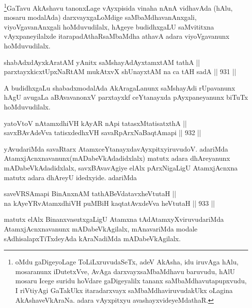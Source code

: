 \begin{artha}
\footnote{oMdu gaDigeyoLage ToLiLxruvudaSeTx, adeV AkAsha, idu iruvAga hAlu, mosaranunx iDutetxVve, AvAga darxvayxsaMbaMdhavu baruvudu, hAlU mosaru Icege suridu hoVdare gaDigeyalilx tananx saMbaMdhavutapupxvudu, I riVtiyAgi GaTakUkx itaradarxvayx saMbaMdhaviruvudakUkx oLagina AkAshaveVkAraNa. adara vAyxpitxyu avashayxvideyeMdathaR.}GaTavu AkAshavu tanonxLage vAyxpisida vinaha nAnA vidhavAda (hAlu, mosaru modalAda) darxvayxgaLoMdige saMbaMdhavanAnxgali, viyoVgavanAnxgali hoMduvudilalx, hAgeye budidhxgaLU saMvititxna vAyxpaneyilalxde itarapadAthaRsaMbaMdha athavA adara viyoVgavanunx hoMduvudilalx.
\end{artha}


\begin{shl}
shabAdxdAyxkAratAM yAnitx saMshayAdAyxtamxtAM tathA ||  \\
parxtayxkicxtUpxNaRtAM mukAtxvX shUnayxtAM na ca tAH sadA \hfill || 931 ||  
\end{shl}

\begin{artha}
A budidhxgaLu shabadxmodalAda AkAragaLanunx saMshayAdi rUpavanunx hAgU avugaLa aBAvavanonxV parxtayxkf ceYtanayxda pAyxpaneyanunx biTuTx hoMduvudilalx.
\end{artha}


\begin{shl}
yatoV\s toV nA\s \s tamxdhiVH kAyAR nApi tatasxMtatisatxthA || \\
savxBAvAdeVva tatisxdedhxVH savaRpArxNaBaqtAmapi \hfill || 932 ||  
\end{shl}

\begin{artha}
yAvudariMda savaRtarx AtamxceYtanayxdavAyxpitxyiruvudoV. adariMda AtamxjAcnxnavanunx(mADabeVkAdadidxlalx) matutx adara dhAreyanunx mADabeVkAdadidxlalx, savxBAvavAgiye elAlx pArxNigaLigU AtamxjAcnxna matutx adara dhAreyU idedxyide. adariMda
\end{artha}

\begin{shl}
saveVRSAmapi BinAnxnAM tathA\s BeVdatavxheVtutaH || \\
na kAyeYRvA\s \s tamxdhiVH puMBiH kaqtatAvxdeVva heVtutaH \hfill || 933 ||  
\end{shl}

\begin{artha}
matutx elAlx BinanxvasutxgaLigU Atamxna tAdAtamxyXviruvudariMda AtamxjAcnxnavanunx mADabeVkAgilalx, mAnavariMda modale sAdhisalapxTiTxdeyAda kAraNadiMda mADabeVkAgilalx.
\end{artha}

